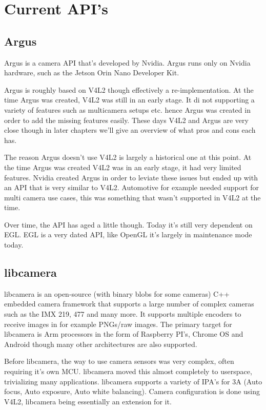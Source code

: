 \chapter{Current API's\label{currentAPIs}}
\section{Argus}

Argus is a camera API that's developed by Nvidia. Argus runs only on Nvidia
hardware, such as the Jetson Orin Nano Developer Kit.

Argus is roughly based on V4L2 though effectively a re-implementation. At the
time Argus was created, V4L2 was still in an early stage. It di not supporting
a variety of features such as multicamera setups etc. hence Argus was created
in order to add the missing features easily. These days V4L2 and Argus are very
close though in later chapters we'll give an overview of what pros and cons
each has.

The reason Argus doesn't use V4L2 is largely a historical one at this point.
At the time Argus was created V4L2 was in an early stage, it had very limited
features. Nvidia created Argus in order to leviate these issues but ended up
with an API that is very similar to V4L2. Automotive for example needed support
for multi camera use cases, this was something that wasn't supported in V4L2 at
the time.

Over time, the API has aged a little though. Today it's still very dependent on
EGL. EGL is a very dated API, like OpenGL it's largely in maintenance mode
today.

\section{libcamera}
libcamera is an open-source (with binary blobs for some cameras) C++ embedded
camera framework that supports a large number of complex cameras such as the
IMX 219, 477 and many more. It supports multiple encoders to receive images in
for example PNGs/raw images. The primary target for libcamera is Arm processors
in the form of Raspberry PI's, Chrome OS and Android though many other
architectures are also supported.

Before libcamera, the way to use camera sensors was very complex, often
requiring it's own MCU. libcamera moved this almost completely to userspace,
trivializing many applications. libcamera supports a variety of IPA's
for 3A (Auto focus, Auto exposure, Auto white balancing). Camera
configuration is done using V4L2, libcamera being essentially an extension for
it.

